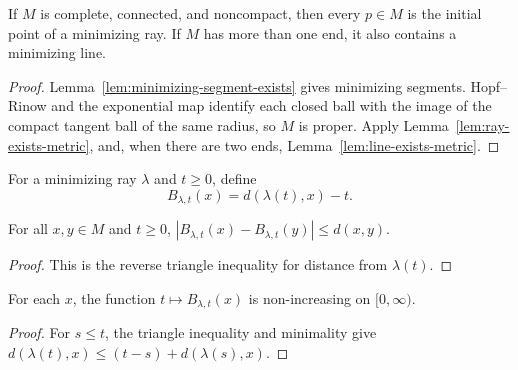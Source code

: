 \begin{lemma}
\label{lem:ends-exist}
\leanok
\label{ends}




If $M$ is complete, connected, and noncompact, then every $p\in M$ is
the initial point of a minimizing ray. If $M$ has more than one end, it
also contains a minimizing line.
\end{lemma}
\begin{proof}
\sketch
\leanok
{}
Lemma~\ref{lem:minimizing-segment-exists} gives minimizing segments.
Hopf--Rinow and the exponential map identify each closed ball with the
image of the compact tangent ball of the same radius, so $M$ is proper.
Apply Lemma~\ref{lem:ray-exists-metric}, and, when there are two ends,
Lemma~\ref{lem:line-exists-metric}.
\end{proof}

\begin{definition}
\label{def:busemann-approx}
\leanok




For a minimizing ray $\lambda$ and $t\ge0$, define
$$B_{\lambda,t}(x)=d(\lambda(t),x)-t.$$
\end{definition}

\begin{lemma}
\label{lem:busemann-approx-lipschitz}
\leanok



For all $x,y\in M$ and $t\ge0$,
$|B_{\lambda,t}(x)-B_{\lambda,t}(y)|\le d(x,y)$.
\label{eqnBlip}
\end{lemma}
\begin{proof}
\sketch
\leanok
This is the reverse triangle inequality for distance from $\lambda(t)$.
\end{proof}

\begin{lemma}
\label{lem:busemann-approx-antitone}
\leanok



For each $x$, the function $t\mapsto B_{\lambda,t}(x)$ is non-increasing
on $[0,\infty)$.
\label{eqnBmono}
\end{lemma}
\begin{proof}
\sketch
\leanok
For $s\le t$, the triangle inequality and minimality give
$d(\lambda(t),x)\le(t-s)+d(\lambda(s),x)$.
\end{proof}

